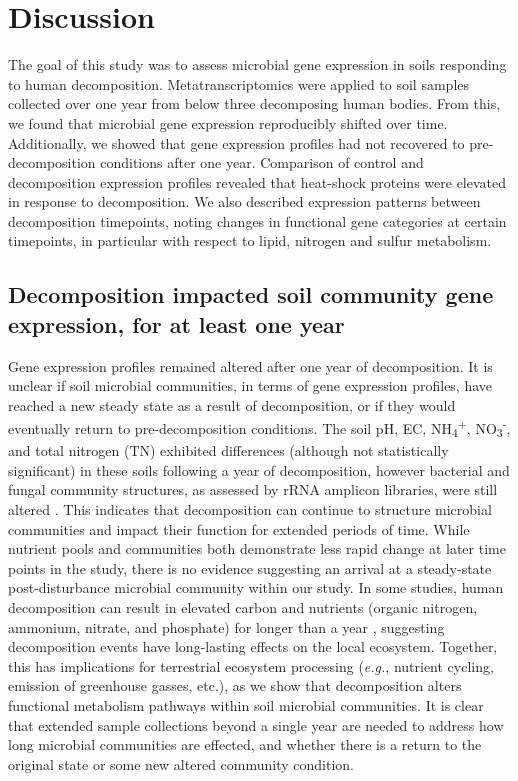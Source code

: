 \documentclass[
  sn-nature,
  lineno, referee]{sn-jnl}
\begin{document}
\section{Discussion}\label{discussion}

The goal of this study was to assess microbial gene expression in soils
responding to human decomposition. Metatranscriptomics were applied to
soil samples collected over one year from below three decomposing human
bodies. From this, we found that microbial gene expression reproducibly
shifted over time. Additionally, we showed that gene expression profiles
had not recovered to pre-decomposition conditions after one year.
Comparison of control and decomposition expression profiles revealed
that heat-shock proteins were elevated in response to decomposition. We
also described expression patterns between decomposition timepoints,
noting changes in functional gene categories at certain timepoints, in
particular with respect to lipid, nitrogen and sulfur metabolism.

\subsection{Decomposition impacted soil community gene expression, for
at least one
year}\label{decomposition-impacted-soil-community-gene-expression-for-at-least-one-year}

Gene expression profiles remained altered after one year of
decomposition. It is unclear if soil microbial communities, in terms of
gene expression profiles, have reached a new steady state as a result of
decomposition, or if they would eventually return to pre-decomposition
conditions. The soil pH, EC, NH\textsubscript{4}\textsuperscript{+},
NO\textsubscript{3}\textsuperscript{-}, and total nitrogen (TN)
exhibited differences (although not statistically significant) in these
soils following a year of decomposition, however bacterial and fungal
community structures, as assessed by rRNA amplicon libraries, were still
altered \citep{taylor_transient_2024}. This indicates that decomposition
can continue to structure microbial communities and impact their
function for extended periods of time. While nutrient pools and
communities both demonstrate less rapid change at later time points in
the study, there is no evidence suggesting an arrival at a steady-state
post-disturbance microbial community within our study. In some studies,
human decomposition can result in elevated carbon and nutrients (organic
nitrogen, ammonium, nitrate, and phosphate) for longer than a year
\citep{debruyn_carrion_2024}, suggesting decomposition events have
long-lasting effects on the local ecosystem. Together, this has
implications for terrestrial ecosystem processing (\emph{e.g.}, nutrient
cycling, emission of greenhouse gasses, etc.), as we show that
decomposition alters functional metabolism pathways within soil
microbial communities. It is clear that extended sample collections
beyond a single year are needed to address how long microbial
communities are effected, and whether there is a return to the original
state or some new altered community condition.
\end{document}

